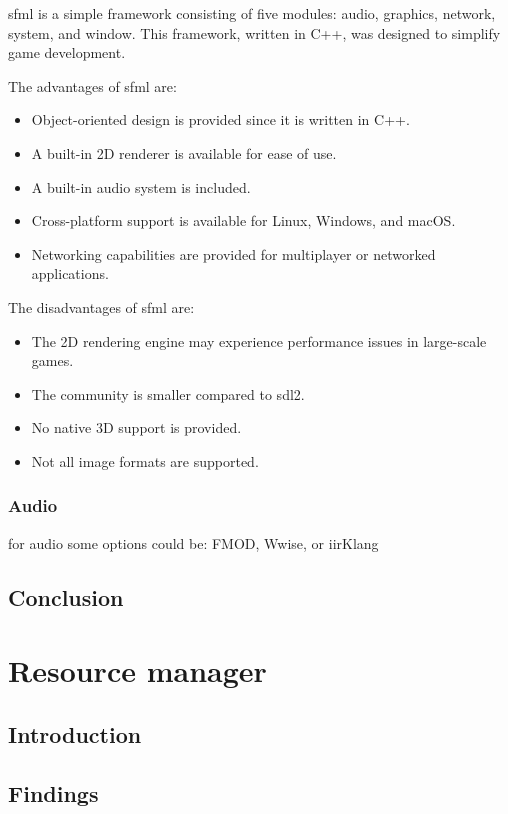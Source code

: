 \documentclass{projdoc}
\begin{document}
\gls{sfml} is a simple framework consisting of five modules: audio, graphics,
network, system, and window. This framework, written in C++, was designed to simplify
game development.

The advantages of \gls{sfml} are:
\begin{itemize}
	\item Object-oriented design is provided since it is written in C++.
	\item A built-in 2D renderer is available for ease of use.
	\item A built-in audio system is included.
	\item Cross-platform support is available for Linux, Windows, and macOS.
	\item Networking capabilities are provided for multiplayer or networked
		applications.
\end{itemize}

The disadvantages of \gls{sfml} are:
\begin{itemize}
	\item The 2D rendering engine may experience performance issues in large-scale
		games.
	\item The community is smaller compared to \gls{sdl2}.
	\item No native 3D support is provided.
	\item Not all image formats are supported.
\end{itemize}

\subsubsection{Audio}

for audio some options could be: FMOD, Wwise, or iirKlang

\subsection{Conclusion}

\section{Resource manager}

\subsection{Introduction}

\subsection{Findings}
\end{document}
